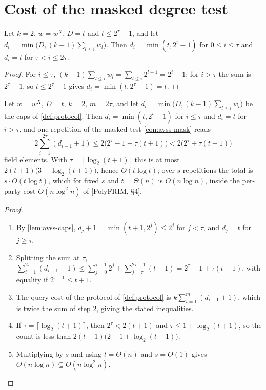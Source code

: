 {{\section{Cost of the masked degree test}

\begin{lemma}\label{lem:avss-caps}
Let $k=2$, $w=w^X$, $D=t$ and $t\le2^\tau-1$, and let
$d_i=\min\big(D,(k-1)\sum_{l\le i}w_l\big)$. Then $d_i=\min(t,2^i-1)$ for $0\le i\le\tau$ and
$d_i=t$ for $\tau<i\le2\tau$.
\end{lemma}

\begin{proof}
For $i\le\tau$, $(k-1)\sum_{l\le i}w_l=\sum_{l\le i}2^{l-1}=2^i-1$; for $i>\tau$ the sum is
$2^\tau-1$, so $t\le2^\tau-1$ gives $d_i=\min(t,2^\tau-1)=t$.
\end{proof}

{\renewcommand{\theproposition}{P3}
\begin{proposition}\label{prop:avss-cost}
Let $w=w^X$, $D=t$, $k=2$, $m=2\tau$, and let $d_i=\min\big(D,(k-1)\sum_{l\le i}w_l\big)$ be
the caps of \ref{def:protocol}. Then $d_i=\min(t,2^i-1)$ for $i\le\tau$ and $d_i=t$ for
$i>\tau$, and one repetition of the masked test \ref{con:avss-mask} reads
\[
2\sum_{i=1}^{2\tau}(d_{i-1}+1)\le2\big(2^\tau-1+\tau(t+1)\big)<2\big(2^\tau+\tau(t+1)\big)
\]
field elements. With $\tau=\lceil\log_2(t+1)\rceil$ this is at most
$2(t+1)\big(3+\log_2(t+1)\big)$, hence $O(t\log t)$; over $s$ repetitions the total is
$s\cdot O(t\log t)$, which for fixed $s$ and $t=\Theta(n)$ is $O(n\log n)$, inside the
per-party cost $O(n\log^2n)$ of {[PolyFRIM, \S4]}.
\end{proposition}}

\begin{proof}\begin{enumerate}
\item By \ref{lem:avss-caps}, $d_j+1=\min(t+1,2^j)\le2^j$ for $j<\tau$, and $d_j=t$ for
$j\ge\tau$.
\item Splitting the sum at $\tau$,
$\sum_{i=1}^{2\tau}(d_{i-1}+1)\le\sum_{j=0}^{\tau-1}2^j+\sum_{j=\tau}^{2\tau-1}(t+1)=2^\tau-1+\tau(t+1)$, with equality if $2^{\tau-1}\le t+1$.
\item The query cost of the protocol of \ref{def:protocol} is $k\sum_{i=1}^m(d_{i-1}+1)$, which is
twice the sum of step 2, giving the stated inequalities.
\item If $\tau=\lceil\log_2(t+1)\rceil$, then $2^\tau<2(t+1)$ and $\tau\le1+\log_2(t+1)$, so the
count is less than $2(t+1)\big(2+1+\log_2(t+1)\big)$.
\item Multiplying by $s$ and using $t=\Theta(n)$ and $s=O(1)$ gives $O(n\log n)\subseteq
O(n\log^2n)$.
\end{enumerate}\end{proof}

}}
